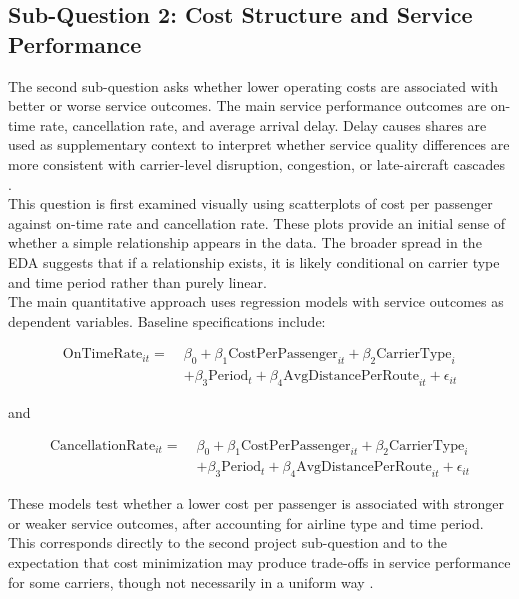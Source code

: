 \documentclass[11pt, letterpaper]{article}
\begin{document}
\subsection{Sub-Question 2: Cost Structure and Service Performance}
The second sub-question asks whether lower operating costs are associated with better or worse service outcomes. The main service performance outcomes are on-time rate, cancellation rate, and average arrival delay. Delay causes shares are used as supplementary context to interpret whether service quality differences are more consistent with carrier-level disruption, congestion, or late-aircraft cascades \cite{mayer2002, lee2023}.\\
\indent This question is first examined visually using scatterplots of cost per passenger against on-time rate and cancellation rate. These plots provide an initial sense of whether a simple relationship appears in the data. The broader spread in the EDA suggests that if a relationship exists, it is likely conditional on carrier type and time period rather than purely linear.\\
\indent The main quantitative approach uses regression models with service outcomes as dependent variables. Baseline specifications include:

\begin{align*}
\text{OnTimeRate}_{it} =\;& \beta_0
+ \beta_1 \text{CostPerPassenger}_{it}
+ \beta_2 \text{CarrierType}_{i} \\
&+ \beta_3 \text{Period}_{t}
+ \beta_4 \text{AvgDistancePerRoute}_{it}
+ \epsilon_{it}
\end{align*}

and

\begin{align*}
\text{CancellationRate}_{it} =\;& \beta_0
+ \beta_1 \text{CostPerPassenger}_{it}
+ \beta_2 \text{CarrierType}_{i} \\
&+ \beta_3 \text{Period}_{t}
+ \beta_4 \text{AvgDistancePerRoute}_{it}
+ \epsilon_{it}
\end{align*}

These models test whether a lower cost per passenger is associated with stronger or weaker service outcomes, after accounting for airline type and time period. This corresponds directly to the second project sub-question and to the expectation that cost minimization may produce trade-offs in service performance for some carriers, though not necessarily in a uniform way \cite{lee2023, mayer2002}.
\end{document}
